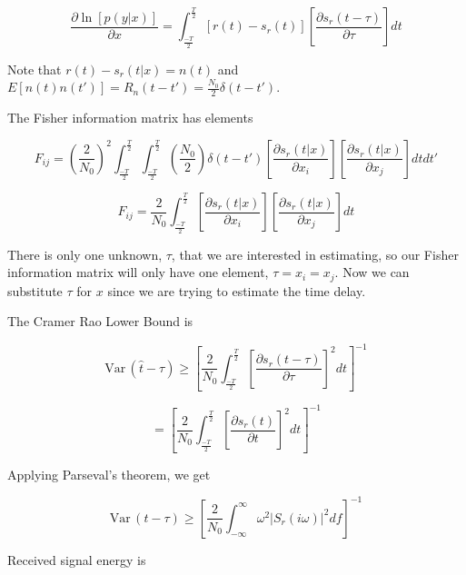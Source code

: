 \documentclass[11pt]{article}
\def\Var{{\textrm{Var}}\,}
\begin{document}
\begin{equation}
\frac{\partial \ln [p(y|x)]}{\partial x} 
=
\int^\frac{T}{2}_\frac{-T}{2}
\left[ r(t) - s_r(t) \right]
\left[ \frac{\partial s_r(t-\tau)}{\partial \tau} \right] dt
\end{equation}

Note that $r(t) - s_r(t|x) = n(t)$ and $E[n(t)n(t')]=R_n(t-t')=\frac{N_0}{2}\delta(t-t')$.


The Fisher information matrix has elements

\begin{equation}
F_{ij}
=
\left( \frac{2}{N_0} \right)^2
\int^\frac{T}{2}_\frac{-T}{2} \int^\frac{T}{2}_\frac{-T}{2}
\left( \frac{N_0}{2} \right)
\delta (t - t')
\left[ \frac{\partial s_r(t|x)}{\partial x_i} \right]
\left[ \frac{\partial s_r(t|x)}{\partial x_j} \right]
dt dt'
\end{equation}

\begin{equation}
F_{ij}
=
\frac{2}{N_0}
\int^\frac{T}{2}_\frac{-T}{2}
\left[ \frac{\partial s_r(t|x)}{\partial x_i} \right]
\left[ \frac{\partial s_r(t|x)}{\partial x_j} \right]
dt
\end{equation}

There is only one unknown, $\tau$, that we are interested in estimating, so our Fisher information matrix will only have one element, $\tau = x_i = x_j$. Now we can substitute $\tau$ for $x$ since we are trying to estimate the time delay.


The Cramer Rao Lower Bound is

\begin{equation}
\Var(\hat{t} - \tau)
\geq
\left[
\frac{2}{N_0}
\int^\frac{T}{2}_\frac{-T}{2} \left[ \frac{\partial s_r(t-\tau)}{\partial \tau} \right]^2 dt \right]^{-1}
\end{equation}


\begin{equation}
= \left[ \frac{2}{N_0} \int^\frac{T}{2}_\frac{-T}{2} \left[ \frac{\partial s_r(t)}{\partial t} \right]^2 dt \right]^{-1}
\end{equation}

Applying Parseval's theorem, we get

\begin{equation}
\Var(t-\tau)
\geq
\left[ \frac{2}{N_0} \int^{\infty}_{-\infty} \omega^2 |S_r(i\omega )|^2 df \right]^{-1}
\end{equation}

Received signal energy is
\end{document}
